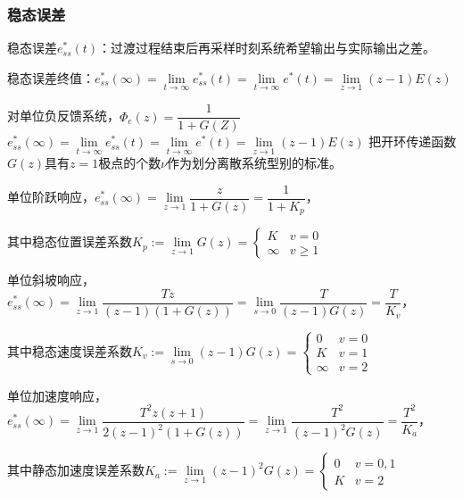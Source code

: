 \documentclass[11pt,a4paper]{ctexart}
\begin{document}
        \subsubsection{稳态误差}
            稳态误差$e^*_{ss}(t)$：过渡过程结束后再采样时刻系统希望输出与实际输出之差。

            稳态误差终值：$e^*_{ss}(\infty)=\lim\limits_{t\rightarrow\infty}e^*_{ss}(t)=\lim\limits_{t\rightarrow\infty}e^*(t)=\lim\limits_{z\rightarrow1}(z-1)E(z)$
            
            对单位负反馈系统，$\varPhi_e(z)=\dfrac{1}{1+G(Z)}$
            $e^*_{ss}(\infty)=\lim\limits_{t\rightarrow\infty}e^*_{ss}(t)=\lim\limits_{t\rightarrow\infty}e^*(t)=\lim\limits_{z\rightarrow1}(z-1)E(z)$
            把开环传递函数$G(z)$具有$z=1$极点的个数$\nu$作为划分离散系统型别的标准。

            单位阶跃响应，$e^*_{ss}(\infty)=\lim\limits_{z\rightarrow1}\dfrac{z}{1+G(z)}=\dfrac{1}{1+K_p}$，
            
            其中稳态位置误差系数$K_p:=\lim\limits_{z\rightarrow1}G(z)=\begin{cases}K&v=0\\\infty&v\geqslant1\end{cases}$

            单位斜坡响应，$e^*_{ss}(\infty)=\lim\limits_{z\rightarrow1}\dfrac{Tz}{(z-1)(1+G(z))}=\lim\limits_{s\rightarrow0}\dfrac{T}{(z-1)G(z)}=\dfrac{T}{K_v}$，
            
            其中稳态速度误差系数$K_v:=\lim\limits_{s\rightarrow0}(z-1)G(z)=\begin{cases}0&v=0\\K&v=1\\\infty&v=2\end{cases}$

            单位加速度响应，$e^*_{ss}(\infty)=\lim\limits_{z\rightarrow1}\dfrac{T^2z(z+1)}{2(z-1)^2(1+G(z))}=\lim\limits_{z\rightarrow1}\dfrac{T^2}{(z-1)^2G(z)}=\dfrac{T^2}{K_a}$，
           
            其中静态加速度误差系数$K_a:=\lim\limits_{z\rightarrow1}(z-1)^2G(z)=\begin{cases}0&v=0,1\\K&v=2\end{cases}$
\end{document}
